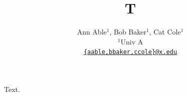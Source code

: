 \documentclass{article}
\title{T}
\author{Ann Able$^1$, Bob Baker$^1$, Cat Cole$^1$ \\ $^1$Univ A \\ \texttt{\url{{aable,bbaker,ccole}@x.edu}}}
\begin{document}
\maketitle
Text.
\end{document}
